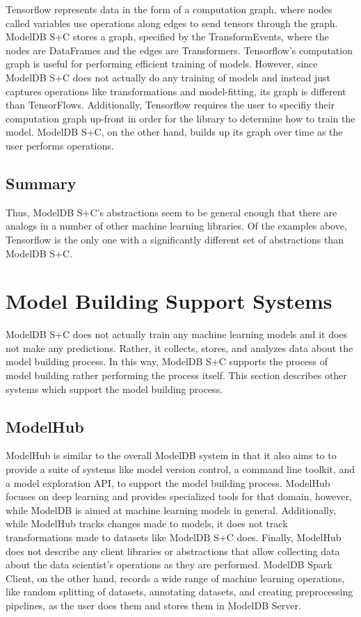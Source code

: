 Tensorflow represents data in the form of a computation graph, where nodes 
called variables use operations along edges to send tensors through the graph.
ModelDB S+C stores a graph, specified by the TransformEvents, where the 
nodes are DataFrames and the edges are Transformers. Tensorflow's computation 
graph is useful for performing efficient training of models. However, since 
ModelDB S+C does not actually do any training of models and instead just 
captures operations like transformations and model-fitting, its graph is 
different than TensorFlows. Additionally, Tensorflow requires the user to 
specifiy their computation graph up-front in order for
the library to determine how to train the model. ModelDB S+C, on 
the other hand, builds up its graph over time as the user performs operations.

\subsection{Summary}
Thus, ModelDB S+C's abstractions seem to be general enough that there are analogs
in a number of other machine learning libraries. Of the examples above, Tensorflow
is the only one with a significantly different set of abstractions than ModelDB S+C.

\section{Model Building Support Systems}
ModelDB S+C does not actually train any machine learning models and it does not 
make any predictions. Rather, it collects, stores, and analyzes data about 
the model building process. In this way, ModelDB S+C supports the process of
model building rather performing the process itself. This section describes
other systems which support the model building process.

\subsection{ModelHub}
ModelHub \cite{modelhub} is similar to the overall ModelDB system in that it also
aims to to provide a suite of systems like model version control, a command line
toolkit, and a model exploration API, to support the model building process. ModelHub
focuses on deep learning and provides specialized tools for that domain, however, 
while ModelDB is aimed at machine learning models in general. Additionally, while
ModelHub tracks changes made to models, it does not track transformations 
made to datasets like ModelDB S+C does. Finally, ModelHub does not describe
any client libraries or abstractions that allow collecting data about the data
scientist's operations as they are performed. ModelDB Spark Client, on the other hand,
records a wide range of machine learning operations, like random splitting of datasets,
annotating datasets, and creating preprocessing pipelines, as the user does them and
stores them in ModelDB Server.

